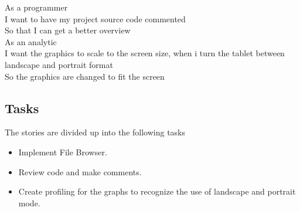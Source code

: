 As a programmer\\
I want to have my project source code commented  \\
So that I can get a better overview \\

As an analytic\\
I want the graphics to scale to the screen size, when i turn the tablet between landscape and portrait format\\
So the graphics are changed to fit the screen\\

\subsection{Tasks} %
\label{sub:Tasks}
The stories are divided up into the following tasks
\begin{itemize}
	\item Implement File Browser.
	\item Review code and make comments.
	\item Create profiling for the graphs to recognize the use of landscape and portrait mode.
\end{itemize}










